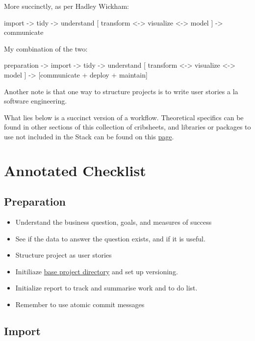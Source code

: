 \documentclass[]{book}
\theoremstyle{definition}
\theoremstyle{definition}
\theoremstyle{definition}
\theoremstyle{remark}
\begin{document}
More succinctly, as per Hadley Wickham:

import -\textgreater{} tidy -\textgreater{} understand {[} transform
\textless{}-\textgreater{} visualize \textless{}-\textgreater{} model
{]} -\textgreater{} communicate

My combination of the two:

preparation -\textgreater{} import -\textgreater{} tidy -\textgreater{}
understand {[} transform \textless{}-\textgreater{} visualize
\textless{}-\textgreater{} model {]} -\textgreater{} {[}communicate +
deploy + maintain{]}

Another note is that one way to structure projects is to write user
stories a la software engineering.

What lies below is a succinct version of a workflow. Theoretical
specifics can be found in other sections of this collection of
cribsheets, and libraries or packages to use not included in the Stack
can be found on this
\href{https://gfleetwood.github.io/noted-resources/data_science.html}{page}.

\chapter{Annotated Checklist}\label{annotated-checklist}

\section{Preparation}\label{preparation}

\begin{itemize}
\item
  Understand the business question, goals, and measures of success
\item
  See if the data to answer the question exists, and if it is useful.
\item
  Structure project as user stories
\item
  Initiliaze
  \href{https://github.com/gfleetwood/ds-crib-sheet/blob/master/other/setup_project.R}{base
  project directory} and set up versioning.
\item
  Initialize report to track and summarise work and to do list.
\item
  Remember to use atomic commit messages
\end{itemize}

\section{Import}\label{import}
\end{document}
